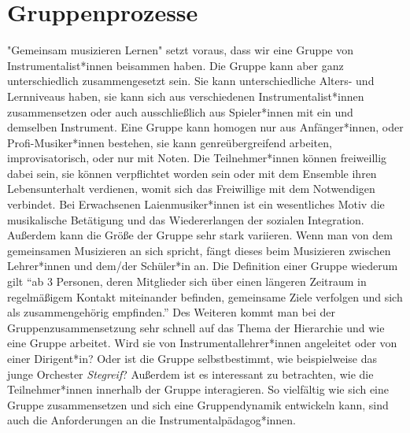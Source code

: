 \section{Gruppenprozesse}
"Gemeinsam musizieren Lernen" setzt voraus, dass wir eine Gruppe von
Instrumentalist*innen beisammen haben. Die Gruppe kann aber ganz unterschiedlich
zusammengesetzt sein. Sie kann unterschiedliche Alters- und Lernniveaus haben,
sie kann sich aus verschiedenen Instrumentalist*innen zusammensetzen oder auch
ausschließlich aus Spieler*innen mit ein und demselben Instrument. Eine Gruppe kann homogen nur aus
Anfänger*innen, oder Profi-Musiker*innen bestehen, sie kann genreübergreifend arbeiten,
improvisatorisch, oder nur mit Noten. Die Teilnehmer*innen können freiweillig dabei
sein, sie können verpflichtet worden sein oder mit dem Ensemble ihren
Lebensunterhalt verdienen, womit sich das Freiwillige mit dem Notwendigen
verbindet. Bei Erwachsenen Laienmusiker*innen ist ein wesentliches Motiv die
musikalische Betätigung und das Wiedererlangen der sozialen Integration.
Außerdem kann die Größe der Gruppe sehr stark variieren.
Wenn man von dem gemeinsamen Musizieren an sich spricht, fängt dieses beim Musizieren
zwischen Lehrer*innen und dem/der Schüler*in an. Die Definition einer Gruppe wiederum gilt
\enquote{ab 3 Personen, deren Mitglieder sich über einen längeren Zeitraum in
regelmäßigem Kontakt miteinander befinden, gemeinsame Ziele verfolgen und sich
als zusammengehörig empfinden.}
\autocite{wikipedia:gruppe}
Des Weiteren kommt man bei der Gruppenzusammensetzung sehr schnell auf das Thema
der Hierarchie und wie eine Gruppe arbeitet. Wird sie von Instrumentallehrer*innen
angeleitet oder von einer Dirigent*in? Oder ist die Gruppe selbstbestimmt,
wie beispielweise
das junge Orchester \emph{Stegreif}? Außerdem ist es interessant zu betrachten, wie
die Teilnehmer*innen innerhalb der Gruppe interagieren. So vielfältig wie sich eine
Gruppe zusammensetzen und sich eine Gruppendynamik entwickeln kann, sind auch
die Anforderungen an die Instrumentalpädagog*innen.


